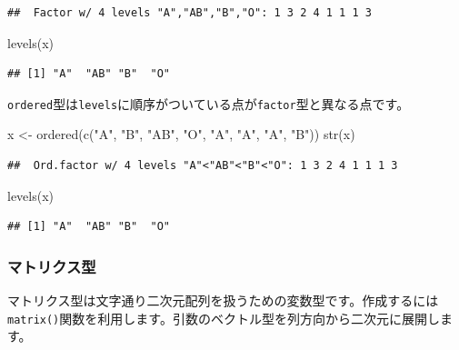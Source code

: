 \documentclass[
  12pt,
]{book}
\newenvironment{Shaded}{\begin{snugshade}}{\end{snugshade}}
\newcommand{\FunctionTok}[1]{\textcolor[rgb]{0.00,0.00,0.00}{#1}}
\newcommand{\NormalTok}[1]{#1}
\newcommand{\OtherTok}[1]{\textcolor[rgb]{0.56,0.35,0.01}{#1}}
\newcommand{\StringTok}[1]{\textcolor[rgb]{0.31,0.60,0.02}{#1}}
\begin{document}
\begin{verbatim}
##  Factor w/ 4 levels "A","AB","B","O": 1 3 2 4 1 1 1 3
\end{verbatim}

\begin{Shaded}
\begin{Highlighting}[numbers=left,,]
\FunctionTok{levels}\NormalTok{(x)}
\end{Highlighting}
\end{Shaded}

\begin{verbatim}
## [1] "A"  "AB" "B"  "O"
\end{verbatim}

\texttt{ordered}型は\texttt{levels}に順序がついている点が\texttt{factor}型と異なる点です。

\begin{Shaded}
\begin{Highlighting}[numbers=left,,]
\NormalTok{x }\OtherTok{\textless{}{-}} \FunctionTok{ordered}\NormalTok{(}\FunctionTok{c}\NormalTok{(}\StringTok{"A"}\NormalTok{, }\StringTok{"B"}\NormalTok{, }\StringTok{"AB"}\NormalTok{, }\StringTok{"O"}\NormalTok{, }\StringTok{"A"}\NormalTok{, }\StringTok{"A"}\NormalTok{, }\StringTok{"A"}\NormalTok{, }\StringTok{"B"}\NormalTok{))}
\FunctionTok{str}\NormalTok{(x)}
\end{Highlighting}
\end{Shaded}

\begin{verbatim}
##  Ord.factor w/ 4 levels "A"<"AB"<"B"<"O": 1 3 2 4 1 1 1 3
\end{verbatim}

\begin{Shaded}
\begin{Highlighting}[numbers=left,,]
\FunctionTok{levels}\NormalTok{(x)}
\end{Highlighting}
\end{Shaded}

\begin{verbatim}
## [1] "A"  "AB" "B"  "O"
\end{verbatim}

\hypertarget{ux30deux30c8ux30eaux30afux30b9ux578b}{%
\subsubsection{マトリクス型}\label{ux30deux30c8ux30eaux30afux30b9ux578b}}

マトリクス型は文字通り二次元配列を扱うための変数型です。作成するには\texttt{matrix()}関数を利用します。引数のベクトル型を列方向から二次元に展開します。
\end{document}
